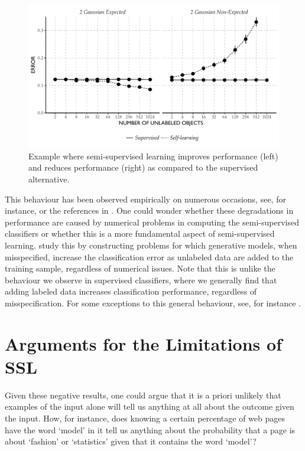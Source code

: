 \documentclass[twoside]{memoir}\usepackage[]{graphicx}\usepackage{xcolor}
\makeatletter
\def\maxwidth{ %
  \ifdim\Gin@nat@width>\linewidth
    \linewidth
  \else
    \Gin@nat@width
  \fi
}
\newenvironment{knitrout}{}{} %
\renewcommand{\cite}{\citep}
\makeatother
\begin{document}
\begin{knitrout}
\color{fgcolor}\begin{figure}
\includegraphics[width=\maxwidth]{figure/plotfail-1} \caption[Example where semi-supervised learning improves performance (left) and reduces performance (right) as compared to the supervised alternative]{Example where semi-supervised learning improves performance (left) and reduces performance (right) as compared to the supervised alternative.}\label{fig:plotfail}
\end{figure}


\end{knitrout}

This behaviour has been observed empirically on numerous occasions, see, for instance, \citep{Elworthy1994} or the references in \citep{Cozman2002}. One could wonder whether these degradations in performance are caused by numerical problems in computing the semi-supervised classifiers or whether this is a more fundamental aspect of semi-supervised learning. \citet{Cozman2003} study this by constructing problems for which generative models, when misspecified, increase the classification error as unlabeled data are added to the training sample, regardless of numerical issues. Note that this is unlike the behaviour we observe in supervised classifiers, where we generally find that adding labeled data increases classification performance, regardless of misspecification. For some exceptions to this general behaviour, see, for instance \cite{Loog2012}.

\section{Arguments for the Limitations of SSL}
Given these negative results, one could argue that it is a priori unlikely that examples of the input alone will tell us anything at all about the outcome given the input. How, for instance, does knowing a certain percentage of web pages have the word `model' in it tell us anything about the probability that a page is about `fashion' or `statistics' given that it contains the word `model'?
\end{document}
